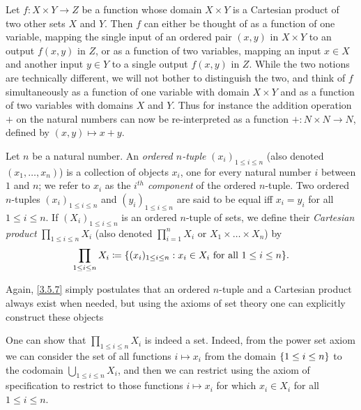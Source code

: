 \begin{note}
	Let \(f : X \times Y \to Z\) be a function whose domain \(X \times Y\) is a Cartesian product of two other sets \(X\) and \(Y\).
	Then \(f\) can either be thought of as a function of one variable, mapping the single input of an ordered pair \((x, y)\) in \(X \times Y\) to an output \(f(x, y)\) in \(Z\), or as a function of two variables, mapping an input \(x \in X\) and another input \(y \in Y\) to a single output \(f(x, y)\) in \(Z\).
	While the two notions are technically different, we will not bother to distinguish the two, and think of \(f\) simultaneously as a function of one variable with domain \(X \times Y\) and as a function of two variables with domains \(X\) and \(Y\).
	Thus for instance the addition operation \(+\) on the natural numbers can now be re-interpreted as a function \(+ : N \times N \to N\), defined by \((x, y) \mapsto x + y\).
\end{note}

\setcounter{thm}{6}
\begin{defn}\label{3.5.7}
	Let \(n\) be a natural number.
	An \emph{ordered \(n\)-tuple} \((x_i)_{1 \leq i \leq n}\) (also denoted \((x_1, \dots, x_n)\)) is a collection of objects \(x_i\), one for every natural number \(i\) between \(1\) and \(n\);
	we refer to \(x_i\) as the \emph{\(i^{th}\) component} of the ordered \(n\)-tuple.
	Two ordered \(n\)-tuples \((x_i)_{1 \leq i \leq n}\) and \((y_i)_{1 \leq i \leq n}\) are said to be equal iff \(x_i = y_i\) for all \(1 \leq i \leq n\).
	If \((X_i)_{1 \leq i \leq n}\) is an ordered \(n\)-tuple of sets, we define their \emph{Cartesian product} \(\prod_{1 \leq i \leq n} X_i\) (also denoted \(\prod_{i=1}^n X_i\) or \(X_1 \times \dots \times X_n\)) by
	\[
		\prod_{1 \leq i \leq n} X_i \coloneqq \set{(x_i)_{1 \leq i \leq n} : x_i \in X_i \text{ for all } 1 \leq i \leq n}.
	\]
\end{defn}

\begin{note}
	Again, \cref{3.5.7} simply postulates that an ordered \(n\)-tuple and a Cartesian product always exist when needed, but using the axioms of set theory one can explicitly construct these objects
\end{note}

\begin{rmk}\label{3.5.8}
	One can show that \(\prod_{1 \leq i \leq n} X_i\) is indeed a set.
	Indeed, from the power set axiom we can consider the set of all functions \(i \mapsto x_i\) from the domain \(\left\lbrace1 \leq i \leq n\right\rbrace\) to the codomain \(\bigcup_{1 \leq i \leq n} X_i\), and then we can restrict using the axiom of specification to restrict to those functions \(i \mapsto x_i\) for which \(x_i \in X_i\) for all \(1 \leq i \leq n\).
\end{rmk}

